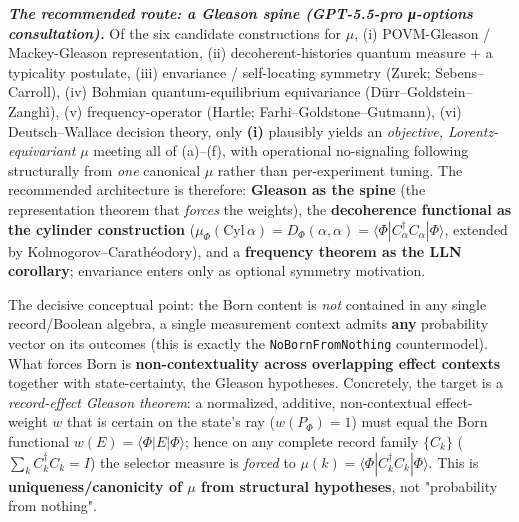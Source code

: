 \documentclass[11pt,a4paper]{article}
\begin{document}
\emph{\textbf{The recommended route: a Gleason spine (GPT-5.5-pro μ-options consultation).}} Of the six candidate constructions for $\mu$, (i) POVM-Gleason / Mackey-Gleason representation, (ii) decoherent-histories quantum measure + a typicality postulate, (iii) envariance / self-locating symmetry (Zurek; Sebens–Carroll), (iv) Bohmian quantum-equilibrium equivariance (Dürr–Goldstein–Zanghì), (v) frequency-operator (Hartle; Farhi–Goldstone–Gutmann), (vi) Deutsch–Wallace decision theory, only \textbf{(i)} plausibly yields an \emph{objective, Lorentz-equivariant} $\mu$ meeting all of (a)–(f), with operational no-signaling following structurally from \emph{one} canonical $\mu$ rather than per-experiment tuning. The recommended architecture is therefore: \textbf{Gleason as the spine} (the representation theorem that \emph{forces} the weights), the \textbf{decoherence functional as the cylinder construction} ($\mu_\Phi(\mathrm{Cyl}\,\alpha) = D_\Phi(\alpha,\alpha) = \langle\Phi|C_\alpha^\dagger C_\alpha|\Phi\rangle$, extended by Kolmogorov–Carathéodory), and a \textbf{frequency theorem as the LLN corollary}; envariance enters only as optional symmetry motivation.

The decisive conceptual point: the Born content is \emph{not} contained in any single record/Boolean algebra, a single measurement context admits \textbf{any} probability vector on its outcomes (this is exactly the \texttt{NoBornFromNothing} countermodel). What forces Born is \textbf{non-contextuality across overlapping effect contexts} together with state-certainty, the Gleason hypotheses. Concretely, the target is a \emph{record-effect Gleason theorem}: a normalized, additive, non-contextual effect-weight $w$ that is certain on the state's ray ($w(P_\Phi)=1$) must equal the Born functional $w(E)=\langle\Phi|E|\Phi\rangle$; hence on any complete record family $\{C_k\}$ ($\sum_k C_k^\dagger C_k = I$) the selector measure is \emph{forced} to $\mu(k) = \langle\Phi|C_k^\dagger C_k|\Phi\rangle$. This is \textbf{uniqueness/canonicity of $\mu$ from structural hypotheses}, not "probability from nothing".
\end{document}
